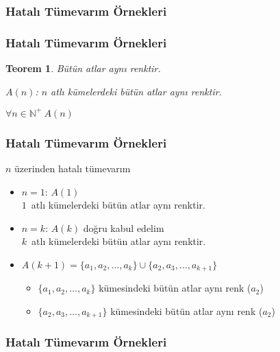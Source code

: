 \documentclass[dvipsnames]{beamer}
\theoremstyle{definition}
\theoremstyle{example}
\theoremstyle{plain}
\newtheorem{teorem}[theorem]{Teorem}
\begin{document}
\begin{frame}
  \frametitle{Hatalı Tümevarım Örnekleri}

  \begin{center}
  \end{center}
\end{frame}

\begin{frame}
  \frametitle{Hatalı Tümevarım Örnekleri}

  \begin{teorem}
    Bütün atlar aynı renktir.

    \pause
    \bigskip
    $A(n)$: $n$ atlı kümelerdeki bütün atlar aynı renktir.

    \medskip
    $\forall n \in \mathbb{N^+}~A(n)$
  \end{teorem}
\end{frame}

\begin{frame}
  \frametitle{Hatalı Tümevarım Örnekleri}

  \begin{block}{$n$ üzerinden hatalı tümevarım}
    \begin{itemize}
      \item $n=1$: $A(1)$\\
        $1$~atlı kümelerdeki bütün atlar aynı renktir.

      \pause
      \medskip
      \item $n=k$: $A(k)$ doğru kabul edelim\\
        $k$~atlı kümelerdeki bütün atlar aynı renktir.

      \pause
      \medskip
      \item $A(k+1)=\{a_1,a_2,\dots,a_k\} \cup \{a_2,a_3,\dots,a_{k+1}\}$
      \begin{itemize}
        \item $\{a_1,a_2,\dots,a_k\}$ kümesindeki bütün atlar aynı renk ($a_2$)
        \item $\{a_2,a_3,\dots,a_{k+1}\}$ kümesindeki bütün atlar aynı renk
          ($a_2$)
      \end{itemize}
    \end{itemize}
  \end{block}
\end{frame}

\begin{frame}
  \frametitle{Hatalı Tümevarım Örnekleri}

  \begin{center}
  \end{center}
\end{frame}
\end{document}
